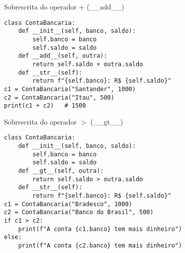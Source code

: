 \begin{frame}[fragile]{Sobrescrita do operador + (\_\_add\_\_)}

    \begin{verbatim}
class ContaBancaria:
    def __init__(self, banco, saldo):
        self.banco = banco
        self.saldo = saldo
    def __add__(self, outra):
        return self.saldo + outra.saldo
    def __str__(self):
        return f"{self.banco}: R$ {self.saldo}"
c1 = ContaBancaria("Santander", 1000)
c2 = ContaBancaria("Itau", 500)
print(c1 + c2)   # 1500
\end{verbatim}


\end{frame}
\begin{frame}[fragile]{Sobrescrita do operador  $>$ (\_\_gt\_\_)}


    \begin{verbatim}
class ContaBancaria:
    def __init__(self, banco, saldo):
        self.banco = banco
        self.saldo = saldo
    def __gt__(self, outra):
        return self.saldo > outra.saldo
    def __str__(self):
        return f"{self.banco}: R$ {self.saldo}"
c1 = ContaBancaria("Bradesco", 1000)
c2 = ContaBancaria("Banco do Brasil", 500)
if c1 > c2:
    print(f"A conta {c1.banco} tem mais dinheiro")
else:
    print(f"A conta {c2.banco} tem mais dinheiro")

\end{verbatim}

\end{frame}

